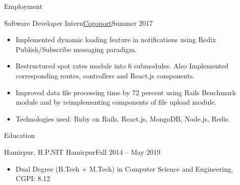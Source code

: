 \documentclass[]{mcdowellcv}
\begin{document}
	\makeheader
	
	\begin{cvsection}{Employment}
		\begin{cvsubsection}{Software Developer Intern}{\href {http://www.cogoport.com/}{Cogoport}}{Summer 2017}			
			\begin{itemize}
				\item Implemented dynamic loading feature in notifications using Redix Publish/Subscribe messaging paradigm.
				\item Restructured spot rates module into 6 submodules. Also Implemented corresponding routes, controllers and React.js components.
				\item Improved data file processing time by 72 percent using Rails Benchmark module and by reimplementing components of file upload module.
				\item Technologies used: Ruby on Rails, React.js, MongoDB, Node.js, Redis.
			\end{itemize}
		\end{cvsubsection}
	\end{cvsection}
	
	\begin{cvsection}{Education}
		\begin{cvsubsection}{Hamirpur, H.P.}{NIT Hamirpur}{Fall 2014 -- May 2019}
			\begin{itemize}
				\item Dual Degree (B.Tech + M.Tech) in Computer Science and Engineering. CGPI: 8.12
			\end{itemize}
		\end{cvsubsection}
	\end{cvsection}
	
\end{document}
